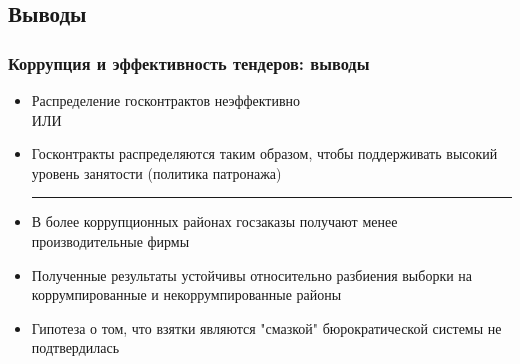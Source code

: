 \subsection{Выводы}
\begin{frame}
\frametitle{Коррупция и эффективность тендеров: выводы}
	\begin{itemize}
		\item Распределение госконтрактов неэффективно
		\\ИЛИ
		\item Госконтракты распределяются таким образом, чтобы поддерживать высокий уровень занятости (политика патронажа)
		\medskip\hrule\medskip
		\item В более коррупционных районах госзаказы получают менее производительные фирмы
		\item Полученные результаты устойчивы относительно разбиения выборки на коррумпированные и некоррумпированные районы
		\item Гипотеза о том, что взятки являются "смазкой" бюрократической системы не подтвердилась
	\end{itemize}
\end{frame}
